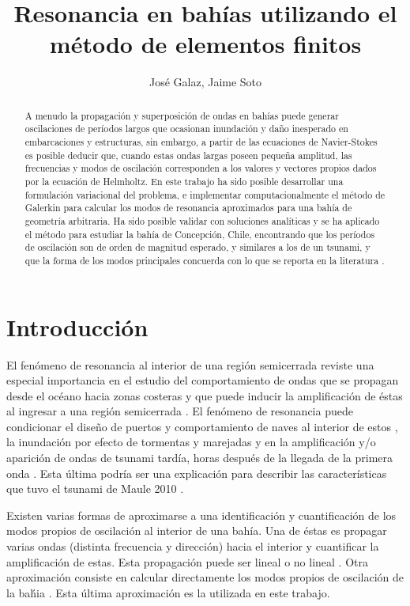 \documentclass[12pt, letterpaper]{article}
\title{Resonancia en bah\'ias utilizando el m\'etodo de elementos finitos}
\author{Jos\'e Galaz, Jaime Soto}
\date{}
\begin{document}
\maketitle

\begin{abstract}
    A menudo la propagaci\'on y superposici\'on de ondas en bah\'ias puede generar oscilaciones de per\'iodos largos que ocasionan inundaci\'on y da\~no inesperado en embarcaciones y estructuras, sin embargo, a partir de las ecuaciones de Navier-Stokes es posible deducir que, cuando estas ondas largas poseen pequeña amplitud, las frecuencias y modos de oscilación corresponden a los valores y vectores propios dados por la ecuación de Helmholtz. En este trabajo ha sido posible desarrollar una formulación variacional del problema, e implementar computacionalmente el método de Galerkin para calcular los modos de resonancia aproximados para una bah\'ia de geometría arbitraria. Ha sido posible validar con soluciones anal\'iticas y se ha aplicado el método para estudiar la bah\'ia de Concepción, Chile, encontrando que los períodos de oscilación son de orden de magnitud esperado, y similares a los de un tsunami, y que la forma de los modos principales concuerda con lo que se reporta en la literatura \cite{Belloti2012}.
\end{abstract}

\section{Introducci\'on}

El fen\'omeno de resonancia al interior de una regi\'on  semicerrada reviste una especial importancia en el estudio del comportamiento de ondas que se propagan desde el oc\'eano hacia zonas costeras y que puede inducir la amplificaci\'on de \'estas al ingresar a una regi\'on semicerrada \cite{Kowalik1993}. El fen\'omeno de resonancia puede condicionar el dise\~no de puertos y comportamiento de naves al interior de estos \cite{Diaz2006web}, la inundaci\'on por efecto de tormentas y marejadas \cite{Kowalik1993} y en la amplificaci\'on y/o aparici\'on de ondas de tsunami tard\'ia, horas despu\'es de la llegada de la primera onda \cite{Kowalik1993}. Esta \'ultima podr\'ia ser una explicaci\'on para describir las caracter\'isticas que tuvo el tsunami de Maule 2010 \cite{Cyper2012web}.

Existen varias formas de aproximarse a una identificaci\'on y cuantificaci\'on de los modos propios de oscilaci\'on al interior de una bah\'ia. Una de \'estas es propagar varias ondas (distinta frecuencia y direcci\'on) hacia el interior y cuantificar la amplificaci\'on de estas. Esta propagaci\'on puede ser lineal o no lineal \cite{Mei2005}. Otra aproximaci\'on consiste en calcular directamente los modos propios de oscilaci\'on de la ba\'hia \cite{Belloti2012, Mei2005}. Esta \'ultima aproximaci\'on es la utilizada en este trabajo.
\end{document}

